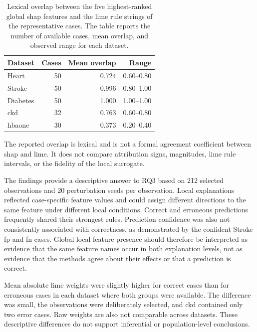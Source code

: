 \begin{table}[htbp]
    \centering
    \small
    \caption{Lexical overlap between the five highest-ranked global \gls{shap} features and the \gls{lime} rule strings of the representative cases. The table reports the number of available cases, mean overlap, and observed range for each dataset.}
    \label{tab:global_local_overlap}
    \begin{tabular}{@{}lrrr@{}}
        \toprule
        \textbf{Dataset} & \textbf{Cases} & \textbf{Mean overlap} & \textbf{Range} \\
        \midrule
        Heart & 50 & 0.724 & 0.60--0.80 \\
        Stroke & 50 & 0.996 & 0.80--1.00 \\
        Diabetes & 50 & 1.000 & 1.00--1.00 \\
        \gls{ckd} & 32 & 0.763 & 0.60--0.80 \\
        \gls{hbaone} & 30 & 0.373 & 0.20--0.40 \\
        \bottomrule
    \end{tabular}
\end{table}

The reported overlap is lexical and is not a formal agreement coefficient between \gls{shap} and \gls{lime}. It does not compare attribution signs, magnitudes, \gls{lime} rule intervals, or the fidelity of the local surrogate.

The findings provide a descriptive answer to RQ3 based on 212 selected observations and 20 perturbation seeds per observation. Local explanations reflected case-specific feature values and could assign different directions to the same feature under different local conditions. Correct and erroneous predictions frequently shared their strongest rules. Prediction confidence was also not consistently associated with correctness, as demonstrated by the confident Stroke \gls{fp} and \gls{fn} cases. Global-local feature presence should therefore be interpreted as evidence that the same feature names occur in both explanation levels, not as evidence that the methods agree about their effects or that a prediction is correct.

Mean absolute \gls{lime} weights were slightly higher for correct cases than for erroneous cases in each dataset where both groups were available. The difference was small, the observations were deliberately selected, and \gls{ckd} contained only two error cases. Raw weights are also not comparable across datasets. These descriptive differences do not support inferential or population-level conclusions.

